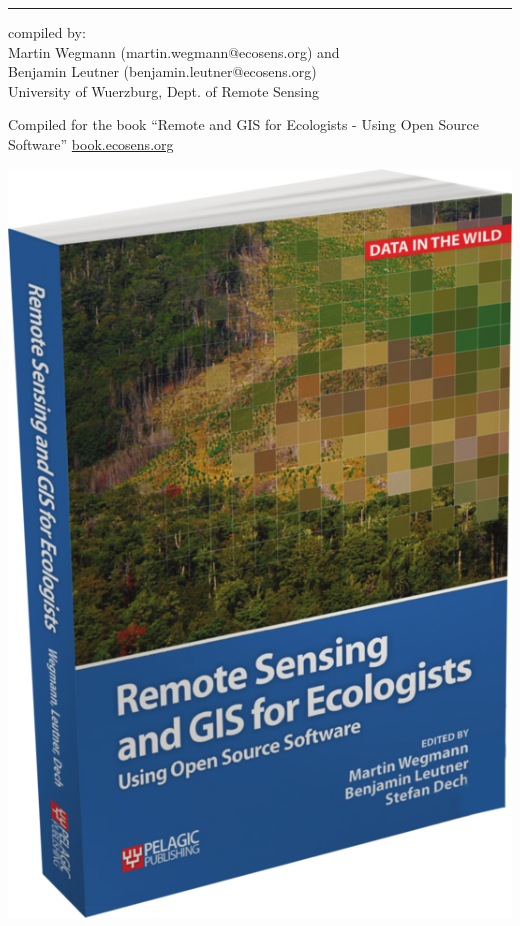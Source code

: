 \documentclass[10pt,landscape]{article}
\begin{document}
\begin{multicols}{3}

\scriptsize

\rule{0.32\textwidth}{0.4pt}

\vspace{.2cm}

compiled by: \vspace{.2cm}\\Martin Wegmann (martin.wegmann@ecosens.org) and \\Benjamin Leutner (benjamin.leutner@ecosens.org) \\ University of Wuerzburg, Dept. of Remote Sensing \\ \THEYEAR	

\vspace{.2cm}

Compiled for the book ``Remote and GIS for Ecologists - Using Open Source Software'' \url{book.ecosens.org}


\bigskip

\bigskip



\begin{center}
 \includegraphics[width=.2\textwidth]{pics/RS_GIS_Ecology_book_wegmann_leutner_dech_book_ecosens_org_BookCover.png}
\end{center}



\end{multicols}
\end{document}
